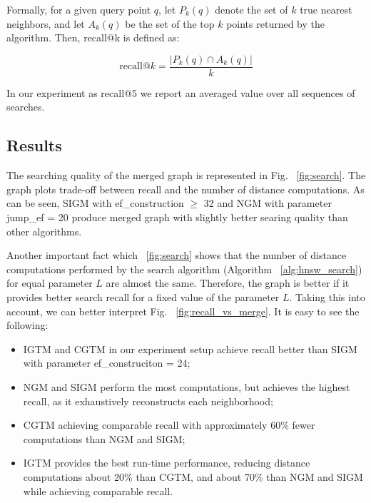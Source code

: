 \documentclass{article}
\begin{document}
Formally, for a given query point \(q\), let \(P_k(q)\) denote the set of \(k\) true nearest neighbors, and let \(A_k(q)\) be the set of the top \(k\) points returned by the algorithm. Then, recall@k is defined as:

\[
\text{recall@}k = \frac{|P_k(q) \cap A_k(q)|}{k}
\]

In our experiment as recall@5 we report an averaged value over all sequences of searches. 

\subsection{Results}

The searching quality of the merged graph is represented in Fig. ~\ref{fig:search}. The graph plots trade-off between recall and the number of distance computations. As can be seen, \textsc{SIGM} with ef\_construction $\ge$ 32 and \textsc{NGM} with parameter jump\_ef = 20 produce merged graph with slightly better searing quality than other algorithms.

Another important fact which ~\ref{fig:search} shows that the number of distance computations performed by the search algorithm (Algorithm ~\ref{alg:hnsw_search}) for equal parameter $L$ are almost the same.  Therefore, the graph is better if it provides better search recall for a fixed value of the parameter $L$. Taking this into account, we can better interpret Fig. ~\ref{fig:recall_vs_merge}. It is easy to see the following:  

\begin{itemize}
    \item\textsc{IGTM} and \textsc{CGTM} in our experiment setup  achieve recall better than \textsc{SIGM} with parameter ef\_construciton = 24;
    \item \textsc{NGM} and \textsc{SIGM} perform the most computations, but achieves the highest recall, as it exhaustively reconstructs each neighborhood;
    \item \textsc{CGTM} achieving comparable recall with approximately 60\% fewer computations than \textsc{NGM} and \textsc{SIGM};
    \item \textsc{IGTM} provides the best run-time performance, reducing distance computations about 20\% than \textsc{CGTM}, and about 70\% than \textsc{NGM} and \textsc{SIGM} while achieving comparable recall.
\end{itemize}
\end{document}
